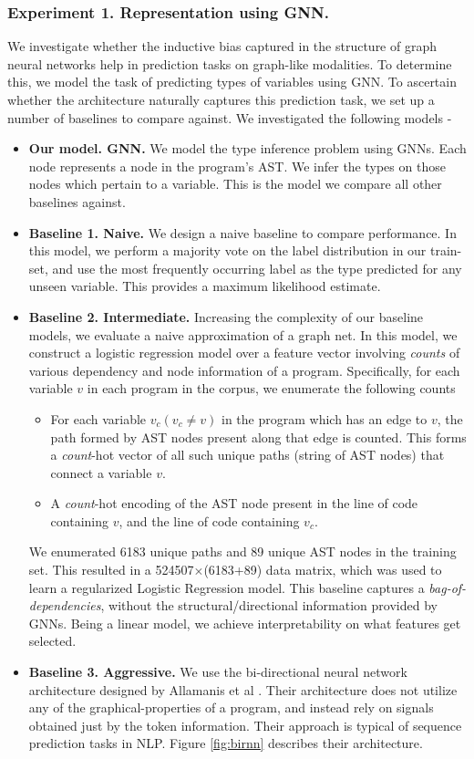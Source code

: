 \subsubsection{Experiment 1. Representation using GNN.}
We investigate whether the inductive bias captured in the structure of graph neural networks help in prediction tasks on graph-like modalities. To determine this, we model the task of predicting types of variables using GNN. To ascertain whether the architecture naturally captures this prediction task, we set up a number of baselines to compare against. We investigated the following models -
\begin{itemize}[noitemsep,topsep=0pt]
	\item \textbf{Our model. GNN.} We model the type inference problem using GNNs. Each node represents a node in the program's AST. We infer the types on those nodes which pertain to a variable. This is the model we compare all other baselines against.
	\item \textbf{Baseline 1. Naive.} We design a naive baseline to compare performance. In this model, we perform a majority vote on the label distribution in our train-set, and use the most frequently occurring label as the type predicted for any unseen variable. This provides a maximum likelihood estimate.
	\item \textbf{Baseline 2. Intermediate.} Increasing the complexity of our baseline models, we evaluate a naive approximation of a graph net. In this model, we construct a logistic regression model over a feature vector involving \textit{counts} of various dependency and node information of a program. Specifically, for each variable $v$ in each program in the corpus, we enumerate the following counts
	\begin{itemize}[noitemsep,topsep=0pt]
		\item For each variable $v_c (v_c\not=v)$ in the program which has an edge to $v$, the path formed by AST nodes present along that edge is counted. This forms a \textit{count}-hot vector of all such unique paths (string of AST nodes) that connect a variable $v$.
		\item A \textit{count}-hot encoding of the AST node present in the line of code containing $v$, and the line of code containing $v_c$.
	\end{itemize}
	We enumerated 6183 unique paths and 89 unique AST nodes in the training set. This resulted in a 524507$\times$(6183+89) data matrix, which was used to learn a regularized Logistic Regression model. This baseline captures a \textit{bag-of-dependencies}, without the structural/directional information provided by GNNs. Being a linear model, we achieve interpretability on what features get selected.
	\item \textbf{Baseline 3. Aggressive.} We use the bi-directional neural network architecture designed by Allamanis et al \cite{hellendoorn2018deep}. Their architecture does not utilize any of the graphical-properties of a program, and instead rely on signals obtained just by the token information. Their approach is typical of sequence prediction tasks in NLP. Figure \ref{fig:birnn} describes their architecture.
\end{itemize}

